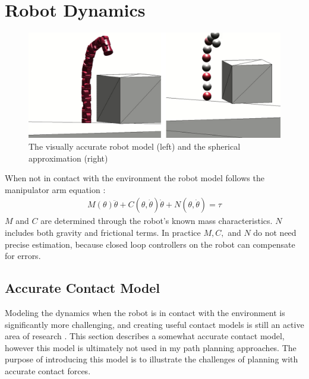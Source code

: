 \documentclass[../thesis.tex]{subfiles}
\begin{document}
\section{Robot Dynamics} \label{sec:robot_dynamics}

\begin{figure}
  \centering
  \includegraphics[width=.7\linewidth]{./Planning/sphere_approxmation.png}
  \caption{The visually accurate robot model (left) and the spherical approximation (right)}
  \label{fig:sphere_approximation}
\end{figure}


When not in contact with the environment the robot model follows the manipulator arm equation \cite{murray1994mathematical}:
\begin{align}
  M(\theta)\ddot \theta + C(\theta, \dot\theta)\dot\theta + N(\theta, \dot\theta) = \tau \label{eq:manipulator}
\end{align}
$M$ and $C$ are determined through the robot's known mass characteristics.
$N$ includes both gravity and frictional terms.
In practice $M, C,$ and $N$ do not need precise estimation, because closed loop controllers on the robot can compensate for errors.

\subsection{Accurate Contact Model}

Modeling the dynamics when the robot is in contact with the environment is significantly more challenging, and creating useful contact models is still an active area of research \cite{Posa2013}\cite{del2012control}\cite{Tonneau}.
This section describes a somewhat accurate contact model, however this model is ultimately not used in my path planning approaches.
The purpose of introducing this model is to illustrate the challenges of planning with accurate contact forces.
\end{document}
